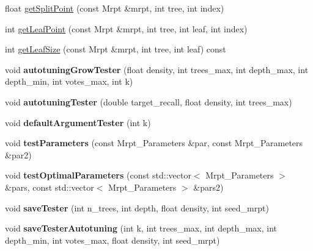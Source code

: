 \begin{DoxyCompactItemize}
\item 
float \mbox{\hyperlink{class_mrpt_test_a37d1f6f738de308f759d1969e5027331}{get\+Split\+Point}} (const Mrpt \&mrpt, int tree, int index)
\item 
int \mbox{\hyperlink{class_mrpt_test_a0f86fdf9acb69beaf6ba83bdb612328f}{get\+Leaf\+Point}} (const Mrpt \&mrpt, int tree, int leaf, int index)
\item 
int \mbox{\hyperlink{class_mrpt_test_a2f93e8ec8143904d8a8a0989e46c8e07}{get\+Leaf\+Size}} (const Mrpt \&mrpt, int tree, int leaf) const
\item 
\mbox{\label{class_mrpt_test_a7dadfb119a316b717a938b16eba5a85d}} 
void {\bfseries autotuning\+Grow\+Tester} (float density, int trees\+\_\+max, int depth\+\_\+max, int depth\+\_\+min, int votes\+\_\+max, int k)
\item 
\mbox{\label{class_mrpt_test_a9c021901ef30d7752bb775ed2b6518c8}} 
void {\bfseries autotuning\+Tester} (double target\+\_\+recall, float density, int trees\+\_\+max)
\item 
\mbox{\label{class_mrpt_test_a03447daf507f3d177cc5496e08fcc3e1}} 
void {\bfseries default\+Argument\+Tester} (int k)
\item 
\mbox{\label{class_mrpt_test_af0d2e00bf524098a7a4af64c8b2cce79}} 
void {\bfseries test\+Parameters} (const Mrpt\+\_\+\+Parameters \&par, const Mrpt\+\_\+\+Parameters \&par2)
\item 
\mbox{\label{class_mrpt_test_ad68f94de06a721657acaf486ccf59fed}} 
void {\bfseries test\+Optimal\+Parameters} (const std\+::vector$<$ Mrpt\+\_\+\+Parameters $>$ \&pars, const std\+::vector$<$ Mrpt\+\_\+\+Parameters $>$ \&pars2)
\item 
\mbox{\label{class_mrpt_test_a49fc9f53a471d9cb4d2757a2153e66a5}} 
void {\bfseries save\+Tester} (int n\+\_\+trees, int depth, float density, int seed\+\_\+mrpt)
\item 
\mbox{\label{class_mrpt_test_ae321902a9a99a5273e217142c433ad8b}} 
void {\bfseries save\+Tester\+Autotuning} (int k, int trees\+\_\+max, int depth\+\_\+max, int depth\+\_\+min, int votes\+\_\+max, float density, int seed\+\_\+mrpt)

\end{DoxyCompactItemize}
